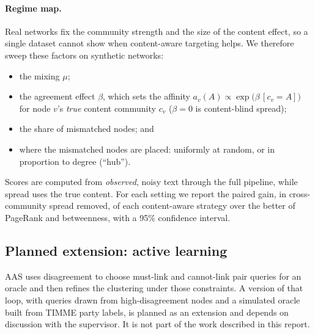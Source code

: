 \paragraph{Regime map.}
Real networks fix the community strength and the size of the content effect, so a
single dataset cannot show when content-aware targeting helps. We therefore sweep
these factors on synthetic networks:
\begin{itemize}
  \item the mixing $\mu$;
  \item the agreement effect $\beta$, which sets the affinity
        $a_v(A) \propto \exp\bigl(\beta\,[c_v = A]\bigr)$ for node $v$'s \emph{true}
        content community $c_v$ ($\beta=0$ is content-blind spread);
  \item the share of mismatched nodes; and
  \item where the mismatched nodes are placed: uniformly at random, or in proportion
        to degree (``hub'').
\end{itemize}
Scores are computed from \emph{observed}, noisy text through the full pipeline, while
spread uses the true content. For each setting we report the paired gain, in
cross-community spread removed, of each content-aware strategy over the better of
PageRank and betweenness, with a 95\% confidence interval.

\subsection{Planned extension: active learning}
\label{sec:method-al}
AAS uses disagreement to choose must-link and cannot-link pair queries for an oracle
and then refines the clustering under those constraints. A version of that loop, with
queries drawn from high-disagreement nodes and a simulated oracle built from TIMME
party labels, is planned as an extension and depends on discussion with the
supervisor. It is not part of the work described in this report.

